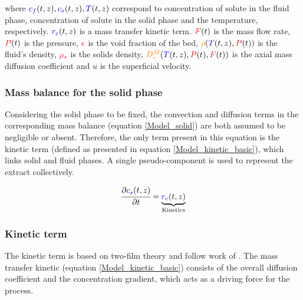 \documentclass[../Article_Model_Parameters.tex]{subfiles}
\begin{document}
	where ${\color{blue}c_f}(t,z), {\color{blue}c_s}(t,z), {\color{blue}T}(t,z)$ correspond to concentration of solute in the fluid phase, concentration of solute in the solid phase and the temperature, respectively. ${\color{blue}r_e}(t,z)$ is a mass transfer kinetic term. ${\color{red}F}(t)$ is the mass flow rate, ${\color{red}P}(t)$ is the pressure, ${\color{magenta}\epsilon}$ is the void fraction of the bed, ${\color{orange}\rho}({\color{blue}T}(t,z),{\color{red}P}(t))$ is the fluid's density, ${\color{magenta}\rho_s}$ is the solids density, ${\color{orange}D^M_e}({\color{blue}T}(t,z),{\color{red}P}(t),{\color{red}F}(t))$ is the axial mass diffusion coefficient and $u$ is the superficial velocity. 
	
	\subsubsection{Mass balance for the solid phase} \label{Mass_balance_solid}
	
	Considering the solid phase to be fixed, the convection and diffusion terms in the corresponding mass balance (equation \ref{Model_solid}) are both assumed to be negligible or absent. Therefore, the only term present in this equation is the kinetic term (defined as presented in equation \ref{Model_kinetic_basic}), which links solid and fluid phases. A single pseudo-component is used to represent the extract collectively. 
	
	{\footnotesize
		\begin{equation} 
			\label{Model_solid}
					\cfrac{\partial {\color{blue}c_s}(t,z)}{\partial t} = \underbrace{ {\color{blue}r_e}(t,z) }_{\text{Kinetics}}
			\end{equation} }
			
	\subsubsection{Kinetic term} \label{CH: Kinetic}
	
	The kinetic term is based on two-film theory and follow work of \citet{Reverchon1996}. The mass transfer kinetic (equation \ref{Model_kinetic_basic}) consists of the overall diffusion coefficient and the concentration gradient, which acts as a driving force for the process.
	
\end{document}
